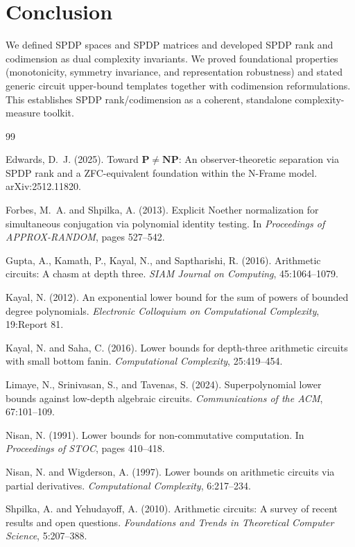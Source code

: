 \documentclass[12pt]{article}
\theoremstyle{definition}
\theoremstyle{remark}
\begin{document}
\section{Conclusion}
We defined SPDP spaces and SPDP matrices and developed SPDP rank and codimension
as dual complexity invariants. We proved foundational properties (monotonicity,
symmetry invariance, and representation robustness) and stated generic circuit
upper-bound templates together with codimension reformulations. This establishes
SPDP rank/codimension as a coherent, standalone complexity-measure toolkit.

\begin{thebibliography}{99}

Edwards, D.~J. (2025).
Toward $\mathbf{P} \neq \mathbf{NP}$: An observer-theoretic separation
via SPDP rank and a ZFC-equivalent foundation within the N-Frame model.
arXiv:2512.11820.

Forbes, M.~A. and Shpilka, A. (2013).
Explicit Noether normalization for simultaneous conjugation via polynomial identity testing.
In \emph{Proceedings of APPROX-RANDOM}, pages 527--542.

Gupta, A., Kamath, P., Kayal, N., and Saptharishi, R. (2016).
Arithmetic circuits: A chasm at depth three.
\emph{SIAM Journal on Computing}, 45:1064--1079.

Kayal, N. (2012).
An exponential lower bound for the sum of powers of bounded degree polynomials.
\emph{Electronic Colloquium on Computational Complexity}, 19:Report 81.

Kayal, N. and Saha, C. (2016).
Lower bounds for depth-three arithmetic circuits with small bottom fanin.
\emph{Computational Complexity}, 25:419--454.

Limaye, N., Srinivasan, S., and Tavenas, S. (2024).
Superpolynomial lower bounds against low-depth algebraic circuits.
\emph{Communications of the ACM}, 67:101--109.

Nisan, N. (1991).
Lower bounds for non-commutative computation.
In \emph{Proceedings of STOC}, pages 410--418.

Nisan, N. and Wigderson, A. (1997).
Lower bounds on arithmetic circuits via partial derivatives.
\emph{Computational Complexity}, 6:217--234.

Shpilka, A. and Yehudayoff, A. (2010).
Arithmetic circuits: A survey of recent results and open questions.
\emph{Foundations and Trends in Theoretical Computer Science}, 5:207--388.

\end{thebibliography}
\end{document}
